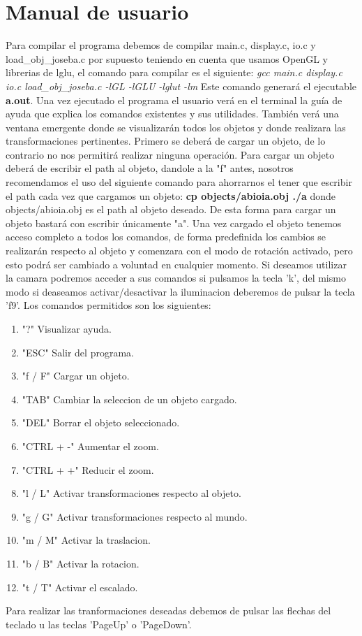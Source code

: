 \documentclass[12pt,a4paper]{article}
\begin{document}
\section{Manual de usuario}

Para compilar el programa debemos de compilar main.c, display.c, io.c y load\_obj\_joseba.c por supuesto teniendo en cuenta que usamos OpenGL y librerias de lglu, el comando para compilar es el siguiente:\newline
\textit{gcc main.c  display.c io.c load\_obj\_joseba.c -lGL -lGLU -lglut -lm}\newline
Este comando generará el ejecutable \textbf{a.out}. \newline
Una vez ejecutado el programa el usuario verá en el terminal la guía de ayuda que explica los comandos existentes y sus utilidades. También verá una ventana emergente donde se visualizarán todos los objetos y donde realizara las transformaciones pertinentes. \newline
Primero se deberá de cargar un objeto, de lo contrario no nos permitirá realizar ninguna operación. Para cargar un objeto deberá de escribir el path al objeto, dandole a la "f" antes, nosotros recomendamos el uso del siguiente comando para ahorrarnos el tener que escribir el path cada vez que cargamos un objeto: \textbf{cp objects/abioia.obj ./a} donde objects/abioia.obj es el path al objeto deseado. De esta forma para cargar un objeto bastará con escribir únicamente "a".\newline
Una vez cargado el objeto tenemos acceso completo a todos los comandos, de forma predefinida los cambios se realizarán respecto al objeto y comenzara con el modo de rotación activado, pero esto podrá ser cambiado a voluntad en cualquier momento. Si deseamos utilizar la camara podremos acceder a sus comandos si pulsamos la tecla 'k', del mismo modo si deaseamos activar/desactivar la iluminacion deberemos de pulsar la tecla 'f9'.\newline
Los comandos permitidos son los siguientes:
\begin{enumerate}
\item "?"		 		 Visualizar ayuda.
\item "ESC"		 		 Salir del programa.
\item "f / F"				 Cargar un objeto.
\item "TAB"		 		 Cambiar la seleccion de un objeto cargado.
\item "DEL"				 Borrar el objeto seleccionado.
\item "CTRL + -"		 Aumentar el zoom.
\item "CTRL + +"		 Reducir el zoom.
\item "l / L"		 	 Activar transformaciones respecto al objeto.
\item "g / G"		 	 Activar transformaciones respecto al mundo.
\item "m / M"		 	 Activar la traslacion.
\item "b / B"			 Activar la rotacion.
\item "t / T"		 	 Activar el escalado.
\end{enumerate}
Para realizar las tranformaciones deseadas debemos de pulsar las flechas del teclado u las teclas 'PageUp' o 'PageDown'.\newline
\end{document}
